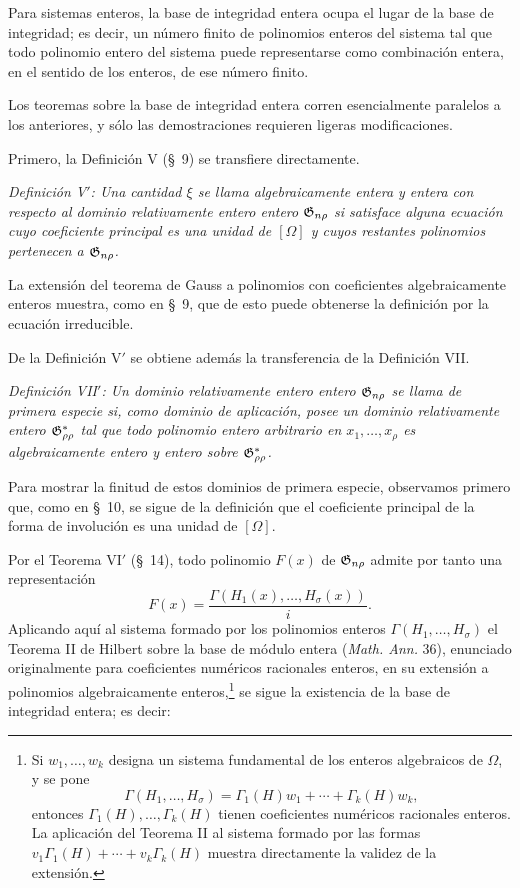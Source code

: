 \documentclass[11pt]{article}
\begin{document}
Para sistemas enteros, la base de integridad entera ocupa el lugar de la base de integridad; es decir, un número finito de polinomios enteros del sistema tal que todo polinomio entero del sistema puede representarse como combinación entera, en el sentido de los enteros, de ese número finito.

Los teoremas sobre la base de integridad entera corren esencialmente paralelos a los anteriores, y sólo las demostraciones requieren ligeras modificaciones.

Primero, la Definición V (\S\ 9) se transfiere directamente.

\emph{Definición V$'$: Una cantidad $\xi$ se llama algebraicamente entera y entera con respecto al dominio relativamente entero entero $\mathfrak{G}_{n\rho}$ si satisface alguna ecuación cuyo coeficiente principal es una unidad de $[\Omega]$ y cuyos restantes polinomios pertenecen a $\mathfrak{G}_{n\rho}$.}

La extensión del teorema de Gauss a polinomios con coeficientes algebraicamente enteros muestra, como en \S\ 9, que de esto puede obtenerse la definición por la ecuación irreducible.

De la Definición V$'$ se obtiene además la transferencia de la Definición VII.

\emph{Definición VII$'$: Un dominio relativamente entero entero $\mathfrak{G}_{n\rho}$ se llama de primera especie si, como dominio de aplicación, posee un dominio relativamente entero $\mathfrak{G}^*_{\rho\rho}$ tal que todo polinomio entero arbitrario en $x_1,\ldots,x_\rho$ es algebraicamente entero y entero sobre $\mathfrak{G}^*_{\rho\rho}$.}

Para mostrar la finitud de estos dominios de primera especie, observamos primero que, como en \S\ 10, se sigue de la definición que el coeficiente principal de la forma de involución es una unidad de $[\Omega]$.

Por el Teorema VI$'$ (\S\ 14), todo polinomio $F(x)$ de $\mathfrak{G}_{n\rho}$ admite por tanto una representación
\[
  F(x)=\frac{\Gamma(H_1(x),\ldots,H_\sigma(x))}{i}.
\]
Aplicando aquí al sistema formado por los polinomios enteros $\Gamma(H_1,\ldots,H_\sigma)$ el Teorema II de Hilbert sobre la base de módulo entera (\emph{Math. Ann.} 36), enunciado originalmente para coeficientes numéricos racionales enteros, en su extensión a polinomios algebraicamente enteros,\footnote{Si $w_1,\ldots,w_k$ designa un sistema fundamental de los enteros algebraicos de $\Omega$, y se pone
\[
  \Gamma(H_1,
\ldots,H_\sigma)=\Gamma_1(H)w_1+\cdots+\Gamma_k(H)w_k,
\]
entonces $\Gamma_1(H),\ldots,\Gamma_k(H)$ tienen coeficientes numéricos racionales enteros. La aplicación del Teorema II al sistema formado por las formas $v_1\Gamma_1(H)+\cdots+v_k\Gamma_k(H)$ muestra directamente la validez de la extensión.} se sigue la existencia de la base de integridad entera; es decir:
\end{document}
